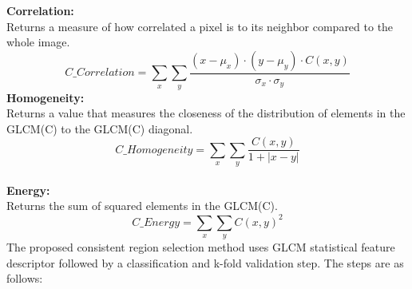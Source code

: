 \noindent \textbf{Correlation:}\\Returns a measure of how correlated a pixel is
to its neighbor compared to the whole image.
\begin{equation}\label{glcm_Correlation}
	C\_Correlation= \sum_{x} \sum_{y} \frac{(x-\mu_{x})\cdot(y-\mu_{y})\cdot C(x,y)}{\sigma_{x}\cdot \sigma_{y}}
\end{equation}
\noindent \textbf{Homogeneity:}\\Returns a value that measures the closeness of
the distribution of elements in the GLCM(C) to the GLCM(C) diagonal.\\
\begin{equation}\label{glcm_homogenity}
	C\_Homogeneity= \sum_{x} \sum_{y} \frac{C(x,y)}{1+|x-y|}
\end{equation}\\
\vspace{2pt}
\noindent\textbf{Energy:}\\Returns the sum of squared elements in the GLCM(C).
\begin{equation}\label{glcm_energy}
	C\_Energy= \sum_{x} \sum_{y} C(x,y)^{2}
\end{equation}
The proposed consistent region selection method uses GLCM statistical feature
descriptor followed by a classification and k-fold validation step. The steps
are as follows:
